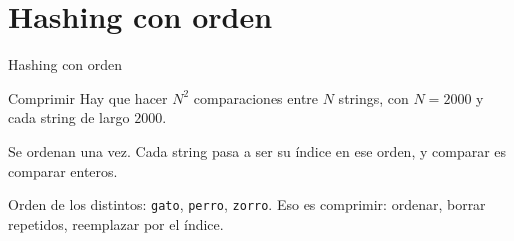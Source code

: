 \section{Hashing con orden}

\begin{frame}
  \vspace{1.5cm}
  \centering
  {\LARGE Hashing con orden}
\end{frame}

\begin{frame}{Comprimir}
  Hay que hacer \(N^{2}\) comparaciones entre \(N\) strings, con \(N = 2000\) y cada string de largo \(2000\).

  \medskip
  Se ordenan una vez. Cada string pasa a ser su índice en ese orden, y comparar es comparar enteros.

  \vspace{0.7em}
  \begin{center}
  \end{center}

  \vspace{0.2em}
  Orden de los distintos: \texttt{gato}, \texttt{perro}, \texttt{zorro}.
  Eso es comprimir: ordenar, borrar repetidos, reemplazar por el índice.
\end{frame}

